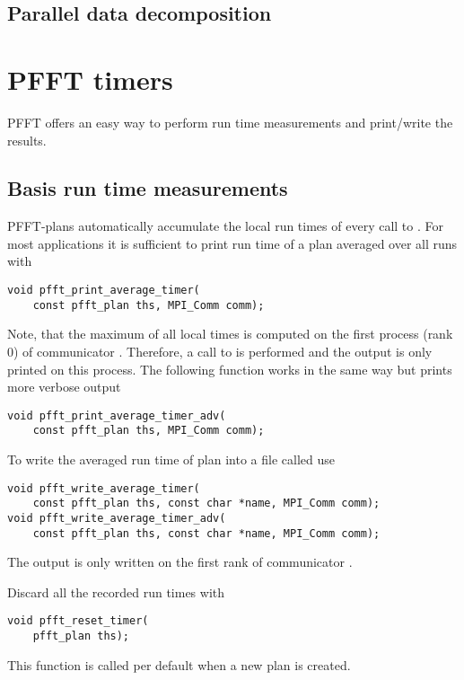 \subsection{Parallel data decomposition}\label{sec:par-data-decomp}



\section{PFFT timers}
PFFT offers an easy way to perform run time measurements and print/write the results.

\subsection{Basis run time measurements}
PFFT-plans automatically accumulate the local run times of every call to .
For most applications it is sufficient to print run time of a plan  averaged over all runs with
\begin{lstlisting}
void pfft_print_average_timer(
    const pfft_plan ths, MPI_Comm comm);
\end{lstlisting}
Note, that the maximum of all local times is computed on the first process (rank 0) of communicator .
Therefore, a call to  is performed and the output is only printed on this process.
The following function works in the same way but prints more verbose output
\begin{lstlisting}
void pfft_print_average_timer_adv(
    const pfft_plan ths, MPI_Comm comm);
\end{lstlisting}

To write the averaged run time of plan  into a file called  use
\begin{lstlisting}
void pfft_write_average_timer(
    const pfft_plan ths, const char *name, MPI_Comm comm);
void pfft_write_average_timer_adv(
    const pfft_plan ths, const char *name, MPI_Comm comm);
\end{lstlisting}
The output is only written on the first rank of communicator .

Discard all the recorded run times with
\begin{lstlisting}
void pfft_reset_timer(
    pfft_plan ths);
\end{lstlisting}
This function is called per default when a new plan is created.

